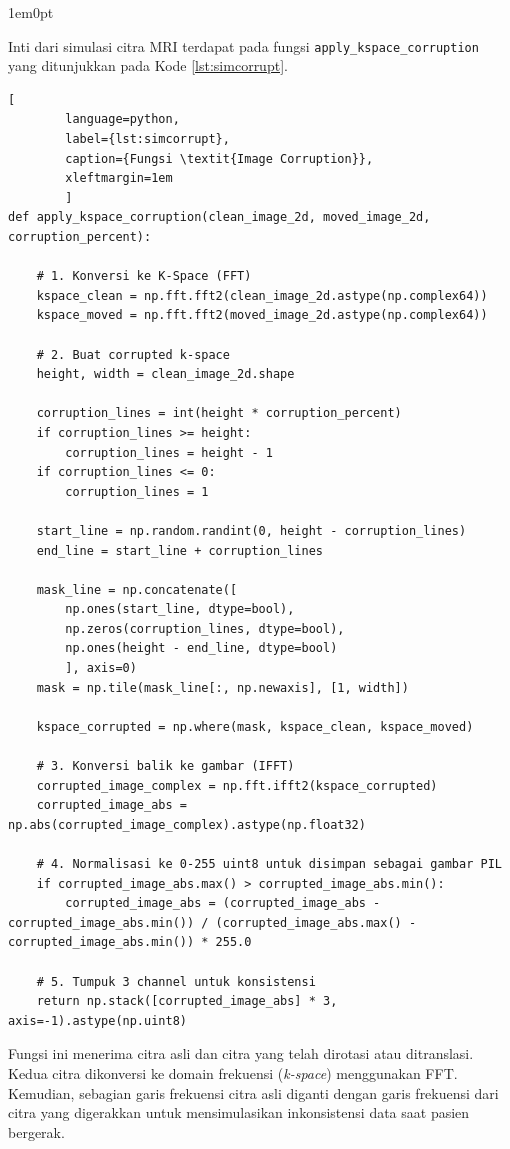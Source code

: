 \begin{adjustwidth}{1em}{0pt}
	\begin{sloppypar}
		\hspace{\parindent}Inti dari simulasi citra MRI terdapat pada fungsi \texttt{apply\_kspace\_corruption} yang ditunjukkan pada Kode \ref{lst:simcorrupt}.
	\end{sloppypar}
	\begin{lstlisting}[
		language=python,
		label={lst:simcorrupt},
		caption={Fungsi \textit{Image Corruption}},
		xleftmargin=1em
		]
def apply_kspace_corruption(clean_image_2d, moved_image_2d, corruption_percent):
	
	# 1. Konversi ke K-Space (FFT)
	kspace_clean = np.fft.fft2(clean_image_2d.astype(np.complex64))
	kspace_moved = np.fft.fft2(moved_image_2d.astype(np.complex64))
		
	# 2. Buat corrupted k-space
	height, width = clean_image_2d.shape
	
	corruption_lines = int(height * corruption_percent)
	if corruption_lines >= height:
		corruption_lines = height - 1
	if corruption_lines <= 0:
		corruption_lines = 1
	
	start_line = np.random.randint(0, height - corruption_lines)
	end_line = start_line + corruption_lines
	
	mask_line = np.concatenate([
		np.ones(start_line, dtype=bool),
		np.zeros(corruption_lines, dtype=bool),
		np.ones(height - end_line, dtype=bool)
		], axis=0)
	mask = np.tile(mask_line[:, np.newaxis], [1, width])
	
	kspace_corrupted = np.where(mask, kspace_clean, kspace_moved)
	
	# 3. Konversi balik ke gambar (IFFT)
	corrupted_image_complex = np.fft.ifft2(kspace_corrupted)
	corrupted_image_abs = np.abs(corrupted_image_complex).astype(np.float32)
	
	# 4. Normalisasi ke 0-255 uint8 untuk disimpan sebagai gambar PIL
	if corrupted_image_abs.max() > corrupted_image_abs.min():
		corrupted_image_abs = (corrupted_image_abs - corrupted_image_abs.min()) / (corrupted_image_abs.max() - corrupted_image_abs.min()) * 255.0
	
	# 5. Tumpuk 3 channel untuk konsistensi
	return np.stack([corrupted_image_abs] * 3, axis=-1).astype(np.uint8)
	\end{lstlisting}
	
	Fungsi ini menerima citra asli dan citra yang telah dirotasi atau ditranslasi. Kedua citra dikonversi ke domain frekuensi (\textit{k-space}) menggunakan FFT. Kemudian, sebagian garis frekuensi citra asli diganti dengan garis frekuensi dari citra yang digerakkan untuk mensimulasikan inkonsistensi data saat pasien bergerak.
\end{adjustwidth}	

